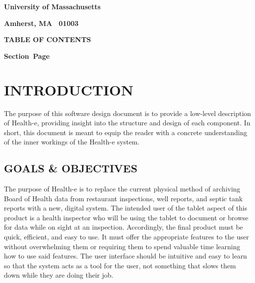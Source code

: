 \documentclass[twoside,letterpaper]{article}
\begin{document}
{\centering{}\bfseries\color{black}
University of Massachusetts
\par}

{\centering{}\bfseries\color{black}
Amherst, MA \ 01003
\par}



{\centering{}\bfseries\color{black}
TABLE OF CONTENTS
\par}


\bigskip

{\bfseries\color{black}
Section\ \hfill  Page}

\setcounter{tocdepth}{9}
\renewcommand\contentsname{}
\tableofcontents

\bigskip

\clearpage\section[INTRODUCTION]{\rmfamily\bfseries\color{black}
INTRODUCTION}
The purpose of this software design document is to provide a low-level description of Health-e, providing insight into the structure and design of each component. In short, this document is meant to equip the reader with a concrete understanding of the inner workings of the Health-e system.

\subsection[GOALS \& OBJECTIVES]{\rmfamily\bfseries\color{black}
GOALS \& OBJECTIVES}
{\rmfamily\color{black}
The purpose of Health-e is to replace the current physical method of archiving Board of Health data from restaurant inspections, well reports, and septic tank reports with a new, digital system. The intended user of the tablet aspect of this product is a health inspector who will be using the tablet to document or browse for data while on sight at an inspection. Accordingly, the final product must be quick, efficient, and easy to use. It must offer the appropriate features to the user without overwhelming them or requiring them to spend valuable time learning how to use said features. The user interface should be intuitive and easy to learn so that the system acts as a tool for the user, not something that slows them down while they are doing their job.
}
\end{document}
